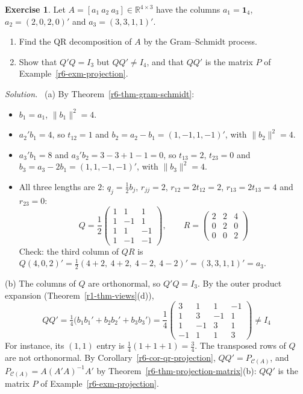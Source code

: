 \documentclass[12pt]{article}
\newcommand{\R}{\mathbb R}
\newcommand{\one}{\mathbf 1}
\theoremstyle{definition}
\newtheorem{exercise}{Exercise}
\newenvironment{solution}{\par\noindent\textit{Solution.}\ }{\par\smallskip}
\begin{document}
\begin{exercise}\label{r6-ex-qr}
Let \(A=[a_1\ a_2\ a_3]\in\R^{4\times3}\) have the columns \(a_1=\one_4\), \(a_2=(2,0,2,0)'\) and
\(a_3=(3,3,1,1)'\).
\begin{enumerate}
\item Find the QR decomposition of \(A\) by the Gram--Schmidt process.
\item Show that \(Q'Q=I_3\) but \(QQ'\ne I_4\), and that \(QQ'\) is the matrix \(P\) of
Example~\ref{r6-exm-projection}.
\end{enumerate}
\end{exercise}
\begin{solution}
(a) By Theorem~\ref{r6-thm-gram-schmidt}:
\begin{itemize}
\item \(b_1=a_1\), \(\lVert b_1\rVert^2=4\).
\item \(a_2'b_1=4\), so \(t_{12}=1\) and \(b_2=a_2-b_1=(1,-1,1,-1)'\), with \(\lVert b_2\rVert^2=4\).
\item \(a_3'b_1=8\) and \(a_3'b_2=3-3+1-1=0\), so \(t_{13}=2\), \(t_{23}=0\) and \(b_3=a_3-2b_1=(1,1,-1,-1)'\),
with \(\lVert b_3\rVert^2=4\).
\item All three lengths are \(2\): \(q_j=\frac12b_j\), \(r_{jj}=2\), \(r_{12}=2t_{12}=2\), \(r_{13}=2t_{13}=4\) and
\(r_{23}=0\):
\[
Q=\frac12\begin{pmatrix}1&1&1\\1&-1&1\\1&1&-1\\1&-1&-1\end{pmatrix},\qquad
R=\begin{pmatrix}2&2&4\\0&2&0\\0&0&2\end{pmatrix}
\]
Check: the third column of \(QR\) is \(Q(4,0,2)'=\frac12(4+2,\ 4+2,\ 4-2,\ 4-2)'=(3,3,1,1)'=a_3\).
\end{itemize}
(b) The columns of \(Q\) are orthonormal, so \(Q'Q=I_3\). By the outer product expansion
(Theorem~\ref{r1-thm-views}(d)),
\[
QQ'=\tfrac14\bigl(b_1b_1'+b_2b_2'+b_3b_3'\bigr)=\frac14\begin{pmatrix}3&1&1&-1\\1&3&-1&1\\1&-1&3&1\\-1&1&1&3\end{pmatrix}\ne I_4
\]
For instance, its \((1,1)\) entry is \(\frac14(1+1+1)=\frac34\). The transposed rows of \(Q\) are not orthonormal. By
Corollary~\ref{r6-cor-qr-projection}, \(QQ'=P_{\mathcal C(A)}\), and \(P_{\mathcal C(A)}=A(A'A)^{-1}A'\) by
Theorem~\ref{r6-thm-projection-matrix}(b): \(QQ'\) is the matrix \(P\) of Example~\ref{r6-exm-projection}.
\end{solution}
\end{document}
